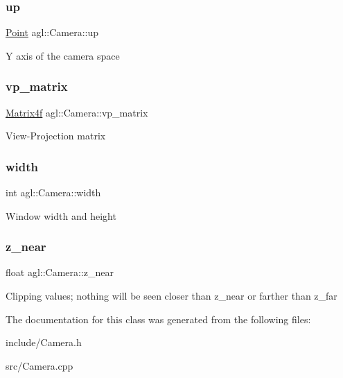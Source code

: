 \subsubsection{\texorpdfstring{up}{up}}
{\footnotesize\ttfamily \mbox{\hyperlink{classagl_1_1Point}{Point}} agl\+::\+Camera\+::up\hspace{0.3cm}{\ttfamily [private]}}

Y axis of the camera space \mbox{\label{classagl_1_1Camera_afa314810b54bd4ba075471c20fe7514e}} 
\subsubsection{\texorpdfstring{vp\_matrix}{vp\_matrix}}
{\footnotesize\ttfamily \mbox{\hyperlink{classagl_1_1Matrix4f}{Matrix4f}} agl\+::\+Camera\+::vp\+\_\+matrix\hspace{0.3cm}{\ttfamily [private]}}

View-\/\+Projection matrix \mbox{\label{classagl_1_1Camera_ab7f25faffd597eb3557e9a41bed2a99f}} 
\subsubsection{\texorpdfstring{width}{width}}
{\footnotesize\ttfamily int agl\+::\+Camera\+::width\hspace{0.3cm}{\ttfamily [private]}}

Window width and height \mbox{\label{classagl_1_1Camera_a20ab35530883700a9e0d1d93157bcd66}} 
\subsubsection{\texorpdfstring{z\_near}{z\_near}}
{\footnotesize\ttfamily float agl\+::\+Camera\+::z\+\_\+near\hspace{0.3cm}{\ttfamily [private]}}

Clipping values; nothing will be seen closer than z\+\_\+near or farther than z\+\_\+far 

The documentation for this class was generated from the following files\+:\begin{DoxyCompactItemize}
\item 
include/Camera.\+h\item 
src/Camera.\+cpp\end{DoxyCompactItemize}
